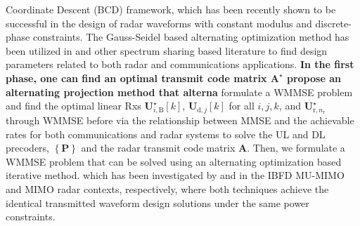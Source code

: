 \documentclass[9pt,journal]{IEEEtran}
\newcommand{\bracket}[1]{{\left [{#1}\right ]}}
\newcommand{\braces}[1]{{\left\{ {#1}\right\}}}
\newcommand{\B}{\textrm{B}}
\newcommand{\rnr}{_{\mathrm{r},n_\mathrm{r}}}
\newcommand{\UBj}{\mathbf{U}_{\textrm{d},j}\bracket{k}}
\theoremstyle{definition}
\begin{document}
Coordinate Descent (BCD) framework, which has been recently
shown to be successful in the design of radar waveforms with constant modulus and discrete-phase constraints. The Gauss-Seidel based alternating optimization method has been utilized in \cite{MCMIMO_RadComm,qian2018joint} and other spectrum sharing based literature to find design parameters related to both radar and communications applications.  \textbf{In the first phase, one can find an optimal transmit code matrix $\mathbf{A}^\star$ propose an alternating projection method that alterna}  formulate a WMMSE problem and find the optimal linear Rxs $\mathbf{U}^\star_{i,\B}\bracket{k}$, $\UBj$ for all $i,j,k$, and $\mathbf{U}^\star\rnr$ through WMMSE before  via the relationship between MMSE and the achievable rates for both communications and radar systems to solve the UL and DL precoders, $\braces{\mathbf{P}}$ and the radar transmit code matrix $\mathbf{A}$. Then, we formulate a WMMSE problem that can be solved using an alternating optimization based iterative method. which has been investigated by \cite{FD_WMMSE} and \cite{mutualinformation_mmse} in the IBFD MU-MIMO and MIMO radar contexts, respectively, where both techniques achieve the identical transmitted waveform design solutions under the same power constraints.  
\fi
\vspace{-10pt}
\end{document}
